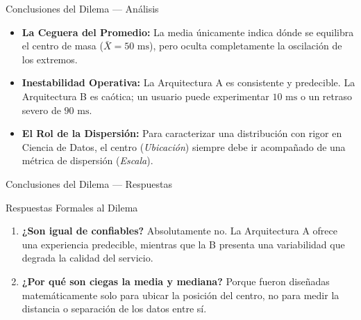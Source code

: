 \documentclass[10pt,aspectratio=169]{beamer}
\begin{document}
\begin{frame}{Conclusiones del Dilema — Análisis}
  \begin{itemize}
    \item \textbf{La Ceguera del Promedio:} La media únicamente indica dónde se equilibra el centro de masa ($\bar{X} = 50 \text{ ms}$), pero oculta completamente la oscilación de los extremos. \pause
    \item \textbf{Inestabilidad Operativa:} La Arquitectura A es consistente y predecible. La Arquitectura B es caótica; un usuario puede experimentar $10 \text{ ms}$ o un retraso severo de $90 \text{ ms}$. \pause
    \item \textbf{El Rol de la Dispersión:} Para caracterizar una distribución con rigor en Ciencia de Datos, el centro (\emph{Ubicación}) siempre debe ir acompañado de una métrica de dispersión (\emph{Escala}).
  \end{itemize}
\end{frame}

\begin{frame}{Conclusiones del Dilema — Respuestas}
  \begin{block}{Respuestas Formales al Dilema}
    \begin{enumerate}
      \item \textbf{¿Son igual de confiables?} Absolutamente no. La Arquitectura A ofrece una experiencia predecible, mientras que la B presenta una variabilidad que degrada la calidad del servicio. \pause
      \item \textbf{¿Por qué son ciegas la media y mediana?} Porque fueron diseñadas matemáticamente solo para ubicar la posición del centro, no para medir la distancia o separación de los datos entre sí.
    \end{enumerate}
  \end{block}
\end{frame}
\end{document}
